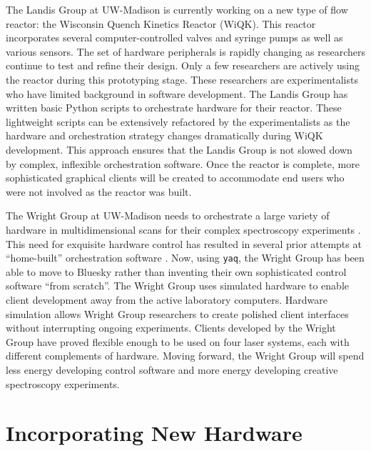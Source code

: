 \documentclass[aip, amsmath, amssymb, reprint,]{revtex4-2}
\newcommand\yaq{\texttt{yaq}}
\begin{document}
The Landis Group at UW-Madison is currently working on a new type of flow reactor: the Wisconsin Quench Kinetics Reactor (WiQK).
This reactor incorporates several computer-controlled valves and syringe pumps as well as various sensors.
The set of hardware peripherals is rapidly changing as researchers continue to test and refine their design.
Only a few researchers are actively using the reactor during this prototyping stage.
These researchers are experimentalists who have limited background in software development.
The Landis Group has written basic Python scripts to orchestrate hardware for their reactor.
These lightweight scripts can be extensively refactored by the experimentalists as the hardware and orchestration strategy changes dramatically during WiQK development.
This approach ensures that the Landis Group is not slowed down by complex, inflexible orchestration software.
Once the reactor is complete, more sophisticated graphical clients will be created to accommodate end users who were not involved as the reactor was built.

The Wright Group at UW-Madison needs to orchestrate a large variety of hardware in multidimensional scans for their complex spectroscopy experiments \cite{MukamelShaul2000a, WrightJohnCurtis2011a}.
This need for exquisite hardware control has resulted in several prior attempts at ``home-built'' orchestration software \cite{CarlsonRogerJohn1988a, MeyerKentAlbert2004b, KainSchuyler2017a, ThompsonBlaiseJonathan2018a, SundenKyle2022}.
Now, using \yaq{}, the Wright Group has been able to move to Bluesky rather than inventing their own sophisticated control software ``from scratch''.
The Wright Group uses simulated hardware to enable client development away from the active laboratory computers.
Hardware simulation allows Wright Group researchers to create polished client interfaces without interrupting  ongoing experiments.
Clients developed by the Wright Group have proved flexible enough to be used on four laser systems, each with different complements of hardware.
Moving forward, the Wright Group will spend less energy developing control software and more energy developing creative spectroscopy experiments.

\section{Incorporating New Hardware}
\end{document}
